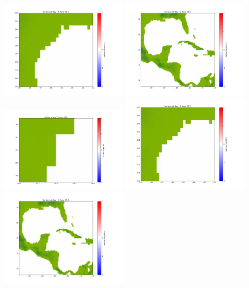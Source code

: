 \documentclass[11pt]{article}
\begin{document}
\includegraphics[width=0.475\textwidth]{frame0093fig1002.png}
\vskip 10pt 
\includegraphics[width=0.475\textwidth]{frame0093fig1003.png}
\vskip 10pt 
\includegraphics[width=0.475\textwidth]{frame0094fig1001.png}
\includegraphics[width=0.475\textwidth]{frame0094fig1002.png}
\vskip 10pt 
\includegraphics[width=0.475\textwidth]{frame0094fig1003.png}
\end{document}
